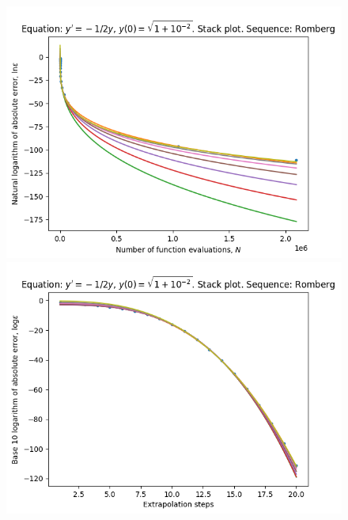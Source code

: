 \begin{figure}[H]
\centering
\begin{minipage}{0.45\textwidth}
\centering
\includegraphics[scale=0.45]{emr_plots/quad_sing_2_hp_romberg_stack.png}
\end{minipage}
\begin{minipage}{0.45\textwidth}
\centering
\includegraphics[scale=0.45]{emr_plots/quad_sing_2_hp_romberg_steps_stack.png}
\end{minipage}
\end{figure}

